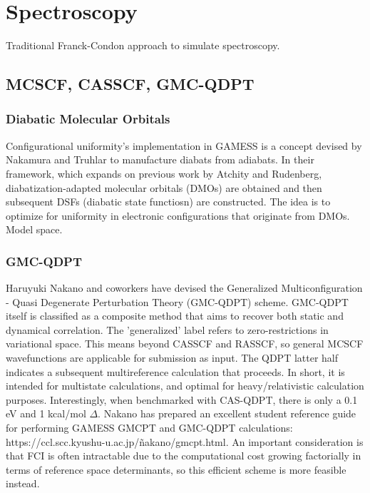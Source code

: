 \section{Spectroscopy}
Traditional Franck-Condon approach to simulate spectroscopy.

\cleardoublepage


\subsection{MCSCF, CASSCF, GMC-QDPT}
        \subsubsection{Diabatic Molecular Orbitals}
        Configurational uniformity's implementation in GAMESS is a concept devised by Nakamura and Truhlar to manufacture diabats from adiabats. In their framework, which expands on previous work by Atchity and Rudenberg, diabatization-adapted molecular orbitals (DMOs) are obtained and then subsequent DSFs (diabatic state functiosn) are constructed. The idea is to optimize for uniformity in electronic configurations that originate from DMOs. Model space.
    

        \subsubsection{GMC-QDPT}
        Haruyuki Nakano and coworkers have devised the Generalized Multiconfiguration - Quasi Degenerate Perturbation Theory (GMC-QDPT) scheme. GMC-QDPT itself is classified as a composite method that aims to recover both static and dynamical correlation. The 'generalized' label refers to zero-restrictions in variational space. This means beyond CASSCF and RASSCF, so general MCSCF wavefunctions are applicable for submission as input. The QDPT latter half indicates a subsequent multireference calculation that proceeds. In short, it is intended for multistate calculations, and optimal for heavy/relativistic calculation purposes. Interestingly, when benchmarked with CAS-QDPT, there is only a 0.1 eV and 1 kcal/mol $\Delta$. Nakano has prepared an excellent student reference guide for performing GAMESS GMCPT and GMC-QDPT calculations: {https://ccl.scc.kyushu-u.ac.jp/\~nakano/gmcpt.html}. An important consideration is that FCI is often intractable due to the computational cost growing factorially in terms of reference space determinants, so this efficient scheme is more feasible instead.

